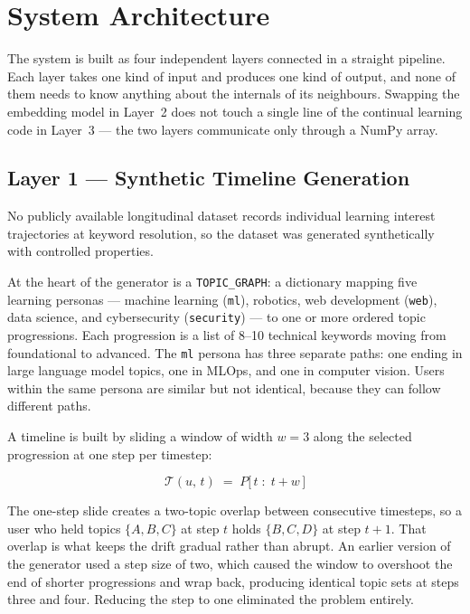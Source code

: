 \documentclass[conference]{IEEEtran}
\begin{document}
\section{System Architecture}

The system is built as four independent layers connected in a
straight pipeline. Each layer takes one kind of input and
produces one kind of output, and none of them needs to know
anything about the internals of its neighbours. Swapping the
embedding model in Layer~2 does not touch a single line of the
continual learning code in Layer~3 --- the two layers
communicate only through a NumPy array.

\subsection{Layer 1 --- Synthetic Timeline Generation}

No publicly available longitudinal dataset records individual
learning interest trajectories at keyword resolution, so the
dataset was generated synthetically with controlled properties.

At the heart of the generator is a \texttt{TOPIC\_GRAPH}: a
dictionary mapping five learning personas --- machine learning
(\texttt{ml}), robotics, web development (\texttt{web}), data
science, and cybersecurity (\texttt{security}) --- to one or
more ordered topic progressions. Each progression is a list
of 8--10 technical keywords moving from foundational to
advanced. The \texttt{ml} persona has three separate paths:
one ending in large language model topics, one in MLOps, and
one in computer vision. Users within the same persona are
similar but not identical, because they can follow different
paths.

A timeline is built by sliding a window of width $w = 3$
along the selected progression at one step per timestep:

\begin{equation}
  \mathcal{T}(u,\,t)
  \;=\;
  P\bigl[\,t \;:\; t + w\,\bigr]
  \label{eq:window}
\end{equation}

The one-step slide creates a two-topic overlap between
consecutive timesteps, so a user who held topics
$\{A, B, C\}$ at step $t$ holds $\{B, C, D\}$ at step
$t{+}1$. That overlap is what keeps the drift gradual rather
than abrupt. An earlier version of the generator used a step
size of two, which caused the window to overshoot the end of
shorter progressions and wrap back, producing identical topic
sets at steps three and four. Reducing the step to one
eliminated the problem entirely.
\end{document}
